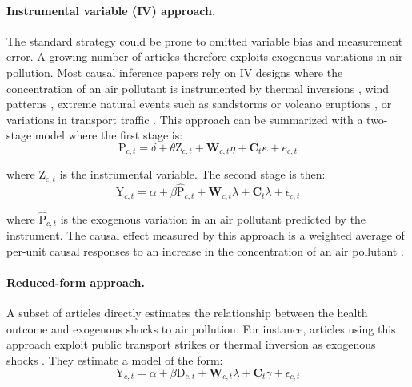 \documentclass[12pt]{article}
\begin{document}
        \begin{sloppypar}
        \paragraph{Instrumental variable (IV) approach.} The standard strategy could be prone to omitted variable bias and measurement error. A growing number of articles therefore exploits exogenous variations in air pollution. Most causal inference papers rely on IV designs where the concentration of an air pollutant is instrumented by thermal inversions \citep{arceo_does_2016}, wind patterns \citep{schwartz_national_2018, deryugina_mortality_2019}, extreme natural events such as sandstorms or volcano eruptions \citep{ebenstein_particulate_2015, halliday_vog_2019}, or variations in transport traffic \citep{moretti_pollution_2011, knittel_caution_2016, schlenker_airports_2016}. This approach can be summarized with a two-stage model where the first stage is: 
        ~
        \begin{equation*}
        \text{P}_{c,t} = \delta + \theta\text{Z}_{c,t} + \textbf{W}_{c,t}\eta + \textbf{C}_{t}\kappa + e_{c,t}
        \end{equation*}
        \end{sloppypar}
        
        \noindent where $\text{Z}_{c,t}$ is the instrumental variable. The second stage is then:
        ~
        \begin{equation*}
        \text{Y}_{c,t} = \alpha + \beta\widehat{\text{P}}_{c,t} + \textbf{W}_{c,t}\lambda + \textbf{C}_{t}\lambda + \epsilon_{c,t}
        \end{equation*}
        
        \noindent where $\widehat{\text{P}}_{c,t}$ is the exogenous variation in an air pollutant predicted by the instrument. The causal effect measured by this approach is a weighted average of per-unit causal responses to an increase in the concentration of an air pollutant \citep{angrist_two-stage_1995}.

        \paragraph{Reduced-form approach.} A subset of articles directly estimates the relationship between the health outcome and exogenous shocks to air pollution. For instance, articles using this approach exploit public transport strikes or thermal inversion as exogenous shocks \citep{bauernschuster_when_2017, jans_economic_2018, godzinski2019short, giaccherini_when_2021}. They estimate a model of the form:
        ~
        \begin{equation*}
        \text{Y}_{c,t} = \alpha + \beta\text{D}_{c,t} + \textbf{W}_{c,t}\lambda + \textbf{C}_{t}\gamma + \epsilon_{c,t}
        \end{equation*}
        
\end{document}
